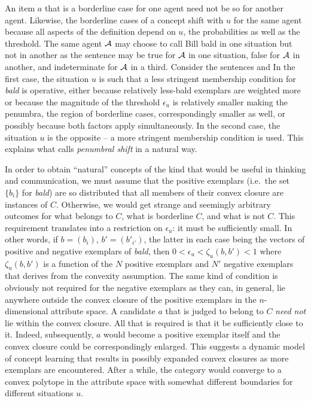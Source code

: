 An item $a$ that is a borderline case for one agent need not be so for another agent. Likewise, the borderline cases of a concept shift with $u$ for the same agent because all aspects of the definition depend on $u$, the probabilities as well as the threshold. The same agent $\cal A$ may choose to call Bill bald in one situation but not in another as the sentence  may be true for $\cal A$ in one situation, false for $\cal A$ in another, and indeterminate for $\cal A$ in a third. Consider the sentences  and  In the first case, the situation $u$ is such that a less stringent membership condition for \emph{bald} is operative, either because relatively less-bald exemplars are weighted more or because the magnitude of the threshold $\epsilon_u$ is relatively smaller making the penumbra, the region of borderline cases, correspondingly smaller as well, or possibly because both factors apply simultaneously. In the second case, the situation $u$ is the opposite -- a more stringent membership condition is used. This explains what \citet{schiffer:vp} calls \emph{penumbral shift} in a natural way.

In order to obtain ``natural'' concepts of the kind that would be useful in thinking and communication, we must assume that the positive exemplars (i.e.\ the set $\{b_i\}$ for \emph{bald}) are so distributed that all members of their convex closure are instances of $C$. Otherwise, we would get strange and seemingly arbitrary outcomes for what belongs to $C$, what is borderline $C$, and what is not $C$. This requirement translates into a restriction on $\epsilon_u$: it must be sufficiently small. In other words, if $b = (b_i)$, $b' = (b'_{i'})$, the latter in each case being the vectors of positive and negative exemplars of \emph{bald}, then $0 < \epsilon_u < \zeta_u(b, b') < 1$ where $\zeta_u(b, b')$ is a function of the $N$ positive exemplars and $N'$ negative exemplars that derives from the convexity assumption. The same kind of condition is obviously not required for the negative exemplars as they can, in general, lie anywhere outside the convex closure of the positive exemplars in the $n$-dimensional attribute space. A candidate $a$ that is judged to belong to $C$ \emph{need not} lie within the convex closure. All that is required is that it be sufficiently close to it. Indeed, subsequently, $a$ would become a positive exemplar itself and the convex closure could be correspondingly enlarged. This suggests a dynamic model of concept learning that results in possibly expanded convex closures as more exemplars are encountered. After a while, the category would converge to a convex polytope in the attribute space with somewhat different boundaries for different situations $u$.

